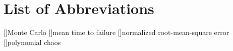 \chapter*{List of Abbreviations}

\begin{acronym}[NRMSE]
[]{Monte Carlo}
[]{mean time to failure}
[]{normalized root-mean-square error}
[]{polynomial chaos}
\end{acronym}
